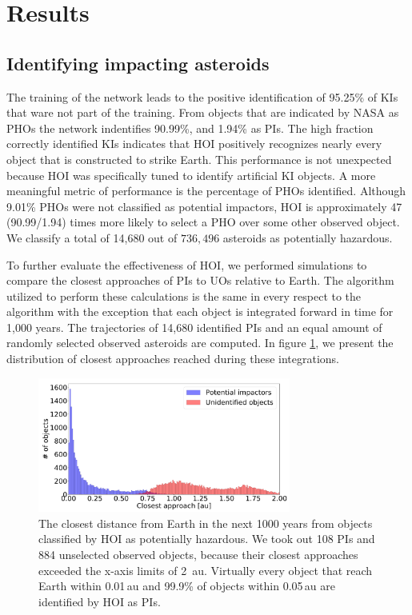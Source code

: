 \documentclass{aa}
\begin{document}
\section{Results}
\label{SEC:Results}

\subsection{Identifying impacting asteroids}

The training of the network leads to the positive identification of
95.25\% of KIs that ware not part of the training.  From objects that
are indicated by NASA as PHOs the network indentifies 90.99\%, and
1.94\% as PIs.  The high fraction correctly identified KIs indicates
that HOI positively recognizes nearly every object that is constructed
to strike Earth.  This performance is not unexpected because HOI was
specifically tuned to identify artificial KI objects. A more
meaningful metric of performance is the percentage of PHOs
identified. Although 9.01\% PHOs were not classified as potential
impactors, HOI is approximately 47 (90.99/1.94) times more likely to
select a PHO over some other observed object.  We classify a total of
14,680 out of $736,496$ asteroids as potentially hazardous.

To further evaluate the effectiveness of HOI, we performed simulations
to compare the closest approaches of PIs to UOs relative to Earth. The
algorithm utilized to perform these calculations is the same in every
respect to the algorithm with the exception that each object is
integrated forward in time for 1,000 years. The trajectories of 14,680
identified PIs and an equal amount of randomly selected observed
asteroids are computed. In figure \ref{FIG:Closeness_Histogram}, we
present the distribution of closest approaches reached during these
integrations.

\begin{figure}[h]
	\hspace*{-0.35cm}
	\includegraphics[width=83mm]{images/3_Closest_Approach_Together.pdf}
	\centering
	\caption{\label{FIG:Closeness_Histogram} The closest distance
          from Earth in the next 1000 years from objects classified by
          HOI as potentially hazardous.  We took out 108 PIs and 884
          unselected observed objects, because their closest
          approaches exceeded the x-axis limits of 2 \,au. Virtually
          every object that reach Earth within 0.01\,au and 99.9\% of
          objects within 0.05\,au are identified by HOI as PIs.
}
\end{figure}
 
\end{document}
